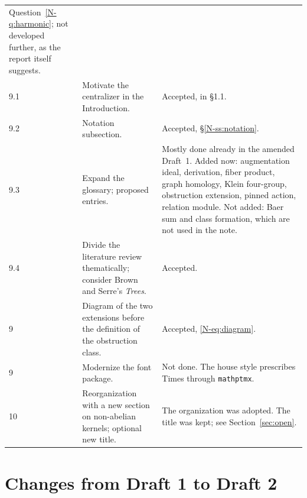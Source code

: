 \documentclass[12pt,letterpaper]{article}
\begin{document}
\begin{longtable}{@{}p{}p{}p{}@{}}
Question~\ref{N-q:harmonic}; not developed further, as the report itself
suggests. \\
9.1 & Motivate the centralizer in the Introduction. & Accepted, in
\S1.1. \\
9.2 & Notation subsection. & Accepted, \S\ref{N-ss:notation}. \\
9.3 & Expand the glossary; proposed entries. & Mostly done already in the
amended Draft~1. Added now: augmentation ideal, derivation, fiber
product, graph homology, Klein four-group, obstruction extension, pinned
action, relation module. Not added: Baer sum and class formation, which
are not used in the note. \\
9.4 & Divide the literature review thematically; consider Brown and
Serre's \emph{Trees}. & Accepted. \\
9 & Diagram of the two extensions before the definition of the
obstruction class. & Accepted, \eqref{N-eq:diagram}. \\
9 & Modernize the font package. & Not done. The house style prescribes
Times through \texttt{mathptmx}. \\
10 & Reorganization with a new section on non-abelian kernels; optional
new title. & The organization was adopted. The title was kept; see
Section~\ref{sec:open}. \\
\bottomrule
\end{longtable}

\section{Changes from Draft 1 to Draft 2}\label{sec:d1d2}
\end{document}

